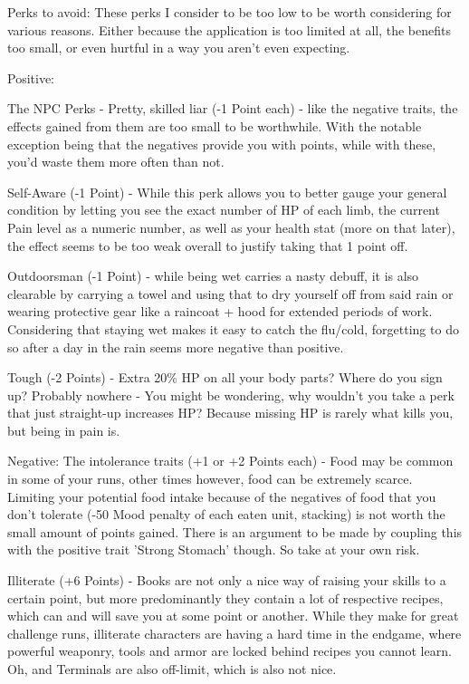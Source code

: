 \documentclass[11pt]{report}
\begin{document}
Perks to avoid:
These perks I consider to be too low to be worth considering for various reasons. Either because the application is too limited at all, the benefits too small, or even hurtful in a way you aren't even expecting.

Positive:

The NPC Perks - Pretty, skilled liar (-1 Point each) - like the negative traits, the effects gained from them are too small to be worthwhile. With the notable exception being that the negatives provide you with points, while with these, you'd waste them more often than not.

Self-Aware (-1 Point) - While this perk allows you to better gauge your general condition by letting you see the exact number of HP of each limb, the current Pain level as a numeric number, as well as your health stat (more on that later), the effect seems to be too weak overall to justify taking that 1 point off.

Outdoorsman (-1 Point) - while being wet carries a nasty debuff, it is also clearable by carrying a towel and using that to dry yourself off from said rain or wearing protective gear like a raincoat + hood for extended periods of work. Considering that staying wet makes it easy to catch the flu/cold, forgetting to do so after a day in the rain seems more negative than positive.

Tough (-2 Points) - Extra 20\% HP on all your body parts? Where do you sign up? Probably nowhere - You might be wondering, why wouldn't you take a perk that just straight-up increases HP? Because missing HP is rarely what kills you, but being in pain is.

Negative:
The intolerance traits (+1 or +2 Points each) - Food may be common in some of your runs, other times however, food can be extremely scarce. Limiting your potential food intake because of the negatives of food that you don't tolerate (-50 Mood penalty of each eaten unit, stacking) is not worth the small amount of points gained. There is an argument to be made by coupling this with the positive trait 'Strong Stomach' though. So take at your own risk.

Illiterate (+6 Points) - Books are not only a nice way of raising your skills to a certain point, but more predominantly they contain a lot of respective recipes, which can and will save you at some point or another. While they make for great challenge runs, illiterate characters are having a hard time in the endgame, where powerful weaponry, tools and armor are locked behind recipes you cannot learn. Oh, and Terminals are also off-limit, which is also not nice.
\end{document}
